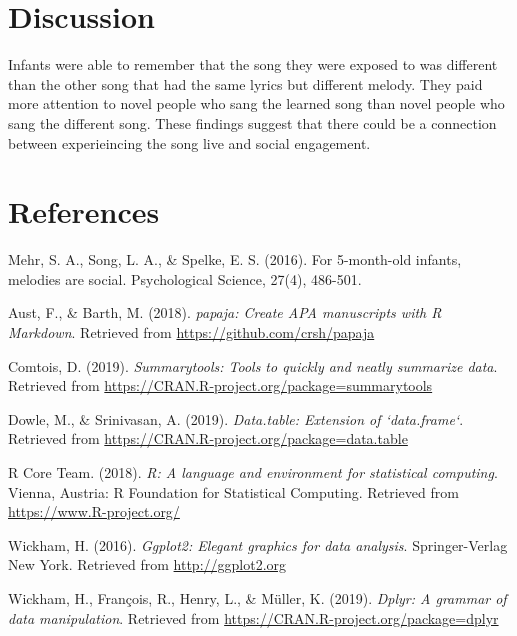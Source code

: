 \documentclass[man]{apa6}
\begin{document}
\section{Discussion}\label{discussion}

Infants were able to remember that the song they were exposed to was
different than the other song that had the same lyrics but different
melody. They paid more attention to novel people who sang the learned
song than novel people who sang the different song. These findings
suggest that there could be a connection between experieincing the song
live and social engagement.

\newpage

\section{References}\label{references}

Mehr, S. A., Song, L. A., \& Spelke, E. S. (2016). For 5-month-old
infants, melodies are social. Psychological Science, 27(4), 486-501.

\begingroup
\setlength{\parindent}{-0.5in} \setlength{\leftskip}{0.5in}

\hypertarget{refs}{}
\hypertarget{ref-R-papaja}{}
Aust, F., \& Barth, M. (2018). \emph{papaja: Create APA manuscripts with
R Markdown}. Retrieved from \url{https://github.com/crsh/papaja}

\hypertarget{ref-R-summarytools}{}
Comtois, D. (2019). \emph{Summarytools: Tools to quickly and neatly
summarize data}. Retrieved from
\url{https://CRAN.R-project.org/package=summarytools}

\hypertarget{ref-R-data.table}{}
Dowle, M., \& Srinivasan, A. (2019). \emph{Data.table: Extension of
`data.frame`}. Retrieved from
\url{https://CRAN.R-project.org/package=data.table}

\hypertarget{ref-R-base}{}
R Core Team. (2018). \emph{R: A language and environment for statistical
computing}. Vienna, Austria: R Foundation for Statistical Computing.
Retrieved from \url{https://www.R-project.org/}

\hypertarget{ref-R-ggplot2}{}
Wickham, H. (2016). \emph{Ggplot2: Elegant graphics for data analysis}.
Springer-Verlag New York. Retrieved from \url{http://ggplot2.org}

\hypertarget{ref-R-dplyr}{}
Wickham, H., François, R., Henry, L., \& Müller, K. (2019). \emph{Dplyr:
A grammar of data manipulation}. Retrieved from
\url{https://CRAN.R-project.org/package=dplyr}

\endgroup
\end{document}
